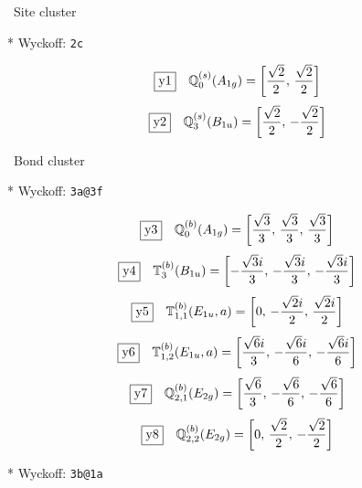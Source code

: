 \documentclass[fleqn,10pt,landscape]{jsarticle}
\begin{document}
\noindent\textbullet\, Site cluster

\vspace{5mm}

\noindent ** Wyckoff: \texttt{2c}

\begin{dmath*}
\fbox{y1}\quad \mathbb{Q}_{0}^{(s)}(A_{1g})=\left[ \frac{\sqrt{2}}{2},\, \frac{\sqrt{2}}{2} \right]
\end{dmath*}
\begin{dmath*}
\fbox{y2}\quad \mathbb{Q}_{3}^{(s)}(B_{1u})=\left[ \frac{\sqrt{2}}{2},\, - \frac{\sqrt{2}}{2} \right]
\end{dmath*}
\vspace{5mm}

\noindent\textbullet\, Bond cluster

\vspace{5mm}

\noindent ** Wyckoff: \texttt{3a@3f}

\begin{dmath*}
\fbox{y3}\quad \mathbb{Q}_{0}^{(b)}(A_{1g})=\left[ \frac{\sqrt{3}}{3},\, \frac{\sqrt{3}}{3},\, \frac{\sqrt{3}}{3} \right]
\end{dmath*}
\begin{dmath*}
\fbox{y4}\quad \mathbb{T}_{3}^{(b)}(B_{1u})=\left[ - \frac{\sqrt{3} i}{3},\, - \frac{\sqrt{3} i}{3},\, - \frac{\sqrt{3} i}{3} \right]
\end{dmath*}
\begin{dmath*}
\fbox{y5}\quad \mathbb{T}_{1,1}^{(b)}(E_{1u},a)=\left[ 0,\, - \frac{\sqrt{2} i}{2},\, \frac{\sqrt{2} i}{2} \right]
\end{dmath*}
\begin{dmath*}
\fbox{y6}\quad \mathbb{T}_{1,2}^{(b)}(E_{1u},a)=\left[ \frac{\sqrt{6} i}{3},\, - \frac{\sqrt{6} i}{6},\, - \frac{\sqrt{6} i}{6} \right]
\end{dmath*}
\begin{dmath*}
\fbox{y7}\quad \mathbb{Q}_{2,1}^{(b)}(E_{2g})=\left[ \frac{\sqrt{6}}{3},\, - \frac{\sqrt{6}}{6},\, - \frac{\sqrt{6}}{6} \right]
\end{dmath*}
\begin{dmath*}
\fbox{y8}\quad \mathbb{Q}_{2,2}^{(b)}(E_{2g})=\left[ 0,\, \frac{\sqrt{2}}{2},\, - \frac{\sqrt{2}}{2} \right]
\end{dmath*}
\vspace{5mm}

\noindent ** Wyckoff: \texttt{3b@1a}
\end{document}
